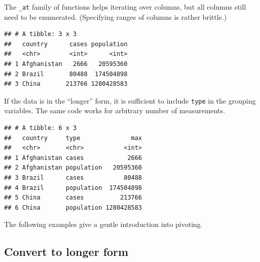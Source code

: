 \documentclass[]{book}
\newenvironment{Shaded}{}{}
\newcommand{\DataTypeTok}[1]{#1}
\newcommand{\KeywordTok}[1]{\textcolor[rgb]{0.00,0.00,1.00}{#1}}
\newcommand{\NormalTok}[1]{#1}
\newcommand{\OperatorTok}[1]{#1}
\newcommand{\StringTok}[1]{\textcolor[rgb]{0.00,0.50,0.50}{#1}}
\begin{document}
The \texttt{\_at} family of functions helps iterating over columns, but all columns still need to be enumerated.
(Specifying ranges of columns is rather brittle.)

\begin{Shaded}
\end{Shaded}

\begin{verbatim}
## # A tibble: 3 x 3
##   country      cases population
##   <chr>        <int>      <int>
## 1 Afghanistan   2666   20595360
## 2 Brazil       80488  174504898
## 3 China       213766 1280428583
\end{verbatim}

If the data is in the ``longer'' form, it is sufficient to include \texttt{type} in the grouping variables.
The same code works for arbitrary number of measurements.

\begin{Shaded}
\end{Shaded}

\begin{verbatim}
## # A tibble: 6 x 3
##   country     type              max
##   <chr>       <chr>           <int>
## 1 Afghanistan cases            2666
## 2 Afghanistan population   20595360
## 3 Brazil      cases           80488
## 4 Brazil      population  174504898
## 5 China       cases          213766
## 6 China       population 1280428583
\end{verbatim}

The following examples give a gentle introduction into pivoting.

\hypertarget{convert-to-longer-form}{%
\subsection{Convert to longer form}\label{convert-to-longer-form}}
\end{document}
